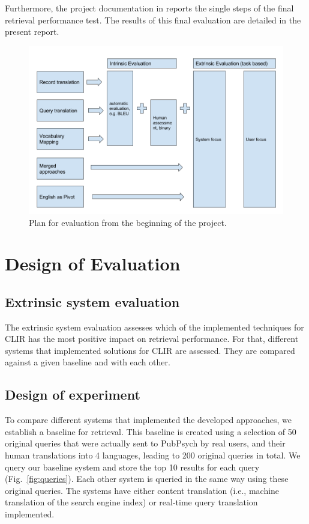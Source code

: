 \documentclass[a4paper,11pt]{article}
\begin{document}
Furthermore, the project documentation in \cite{m1.3.2_2018} reports the single steps of the final retrieval performance test. The results of this final evaluation are detailed in the present report.
 
\begin{figure}[!hb]
\centering
\includegraphics[width=14cm]{./img/overview_evaluation.png}
\caption{Plan for evaluation from the beginning of the project.}
\label{fig:overview}
\end{figure}

\newpage
\section{Design of Evaluation}
\subsection{Extrinsic system evaluation}
The extrinsic system evaluation assesses which of the implemented techniques for CLIR has the most positive impact on retrieval performance. For that, different systems that implemented solutions for CLIR are assessed. They are compared against a given baseline and with each other. 

\subsection{Design of experiment}
\label{sec:design_of_experiment}
To compare different systems that implemented the developed approaches, we establish a baseline for retrieval. This baseline is created using a selection of 50 original queries that were actually sent to PubPsych by real users, and their human translations into 4 languages, leading to 200 original queries in total. We query our baseline system and store the top 10 results for each query (Fig.~\ref{fig:queries}). Each other system is queried in the same way using these original queries. The systems have either content translation (i.e., machine translation of the search engine index) or real-time query translation implemented. 
\end{document}
